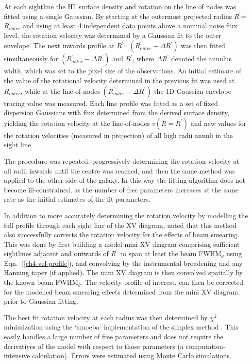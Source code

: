 \documentclass[traditabstract]{aa} %
\newcommand\HI{H{\small I}}
\begin{document}
At each sightline the \HI\ surface density and rotation on the line of 
nodes was fitted using a single Gaussian. By starting at the outermost 
projected radius 
$R^{\prime}$=$R^{\prime}_{outer}$ and using
at least 4 independent data points above a nominal noise flux level,
the rotation velocity was determined by a Gaussian 
fit to the outer envelope. The next inwards profile at
$R^{\prime}$=$(R^{\prime}_{outer} - \Delta R^{\prime})$ was then fitted
simultaneously for $(R^{\prime}_{outer} - \Delta R^{\prime})$ and
$R^{\prime}$, where $\Delta R^{\prime}$ denoted the annulus width,
which was set to
the pixel size of the observations. An initial estimate of the value of
the rotational velocity determined in the previous fit was used at
$R^{\prime}_{outer}$, while at the line-of-nodes $(R^{\prime}_{outer}
- \Delta R^{\prime})$ the 1D Gaussian envelope tracing value was
measured. Each line profile was fitted as a set of fixed dispersion
Gaussians with flux determined from the derived surface density,
yielding the rotation velocity at the line-of-nodes $v(R=R^{\prime})$
and new values for the rotation velocities (measured in projection) of
all high radii annuli in the sight line.

The procedure was repeated, progressively determining the rotation
velocity at all radii inwards until the centre was reached, and then
the same method was applied to the other side of the galaxy. In this
way the fitting algorithm does not become ill-constrained, as the
number of free parameters increases at the same rate as the initial
estimates of the fit parameters.

In addition to more accurately determining the rotation velocity by
modelling the full profile through each sight line of the XV diagram,
\citet{kvdk2004} noted that
this method also successfully corrects the rotation velocity
for the effects of beam smearing. This was done by first building a
model mini XV diagram comprising sufficient sightlines adjacent and
outwards of $R^{\prime}$ to span at least the beam FWHM$_{\theta}$ using
Eqn.~(\ref{ch4-vel-profile}), and convolving by the instrumental broadening
and any Hanning taper (if applied). The mini XV diagram is then convolved
spatially by the known beam FWHM$_{\theta}$. The velocity profile of interest,
can then be corrected for the modelled beam smearing effects
determined from the mini XV diagram, prior to Gaussian fitting.

The best fit rotation velocity at each radius was then determined by
$\chi^2$ minimization using the `amoeba' \citep{ptvf1992}
implementation of the simplex method \citep{nm1965}. This easily 
handles a large number of free parameters and does not require the 
derivatives of the model with respect to
those parameters (a computation-intensive calculation). Errors were estimated
using Monte Carlo simulations.
\end{document}
